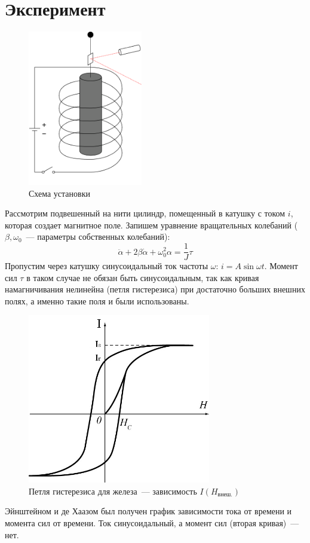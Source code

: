 \documentclass[a4paper]{article}
\begin{document}
\section*{Эксперимент}
\begin{figure}[H]
	\centering
	\includegraphics[width=5cm]{lab.png}
	\caption{Схема установки}
\end{figure}
Рассмотрим подвешенный на нити цилиндр, помещенный в катушку с током $i$, которая создает магнитное поле. Запишем уравнение вращательных колебаний ($\beta,\omega_0$~--- параметры собственных колебаний):
$$\ddot{\alpha}+2\beta\dot{\alpha}+\omega_0^2\alpha=\frac{1}{J}\tau$$
Пропустим через катушку синусоидальный ток частоты $\omega$: $i=A\sin\omega t$. Момент сил $\tau$ в таком случае не обязан быть синусоидальным, так как кривая намагничивания нелинейна (петля гистерезиса) при достаточно больших внешних полях, а именно такие поля и были использованы.
\begin{figure}[H]
	\centering
	\includegraphics[width=8cm]{hyst.png}
	\caption{Петля гистерезиса для железа~--- зависимость $I(H_{\mbox{внеш.}})$}
\end{figure}
Эйнштейном и де Хаазом был получен график зависимости тока от времени и момента сил от времени. Ток синусоидальный, а момент сил (вторая кривая)~--- нет.
\end{document}
